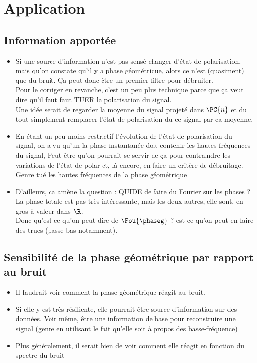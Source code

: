 \section{Application}

\subsection{Information apportée}

\begin{itemize}
	\item Si une source d'information n'est pas sensé changer d'état de polarisation, mais qu'on constate qu'il y a phase géométrique, alors ce n'est (quasiment) que du bruit. Ça peut donc être un premier filtre pour débruiter.
	\\
	
	Pour le corriger en revanche, c'est un peu plus technique parce que ça veut dire qu'il faut faut TUER la polarisation du signal.
	\\
	Une idée serait de regarder la moyenne du signal projeté dans $\PC{n}$ et du tout simplement remplacer l'état de polarisation du ce signal par ca moyenne.
	
	\item En étant un peu moins restrictif l'évolution de l'état de polarisation du signal, on a vu qu'un la phase instantanée doit contenir les hautes fréquences du signal, Peut-être qu'on pourrait se servir de ça pour contraindre les variations de l'état de polar et, là encore, en faire un critère de débruitage. Genre tué les hautes fréquences de la phase géométrique
	
	\item D'ailleurs, ca amène la question : QUIDE de faire du Fourier sur les phases ? La phase totale est pas très intéressante, mais les deux autres, elle sont, en gros à valeur dans $\R$.\\
	Donc qu'est-ce qu'on peut dire de $\Fou{\phaseg}$ ? est-ce qu'on peut en faire des trucs (passe-bas notamment).
	
\end{itemize}




\subsection{Sensibilité de la phase géométrique par rapport au bruit}

\begin{itemize}
	\item Il faudrait voir comment la phase géométrique réagit au bruit.
	
	\item Si elle y est très résiliente, elle pourrait être source d'information sur des données. Voir même, être une information de base pour reconstruire une signal (genre en utilisant le fait qu'elle soit à propos des basse-fréquence)
	
	\item Plus généralement, il serait bien de voir comment elle réagit en fonction du spectre du bruit
	
\end{itemize}



